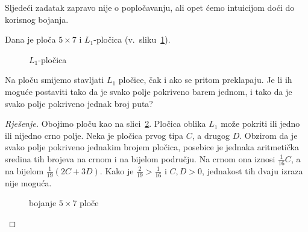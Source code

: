 \documentclass[11pt]{scrartcl}
\begin{document}
Sljedeći zadatak zapravo nije o popločavanju, ali opet ćemo intuicijom doći do korisnog bojanja.
\begin{zadatak}
Dana je ploča $5 \times 7$ i $L_1$-pločica (v.\ sliku~\ref{fig:L_1}).

\begin{figure}[h!]
\centering
{}
\caption{$L_1$-pločica}
\label{fig:L_1}
\end{figure}

\noindent Na ploču smijemo stavljati $L_1$ pločice, čak i ako se pritom preklapaju. Je li ih moguće postaviti tako da je svako polje pokriveno barem jednom, i tako da je svako polje pokriveno jednak broj puta?
\end{zadatak}
\begin{proof}[Rješenje]
Obojimo ploču kao na slici~\ref{fig:5times7}. Pločica oblika $L_1$ može pokriti ili jedno ili nijedno crno polje. Neka je pločica prvog tipa $C$, a drugog $D$. Obzirom da je svako polje pokriveno jednakim brojem pločica, posebice je jednaka aritmetička sredina tih brojeva na crnom i na bijelom području. Na crnom ona iznosi $\frac{1}{16} C$, a na bijelom $\frac{1}{19} \left(2C + 3D\right)$. Kako je $\frac{2}{19} > \frac{1}{16}$ i $C, D > 0$, jednakost tih dvaju izraza nije moguća.
\begin{figure}[h]
\centering
{}
\caption{bojanje $5 \times 7$ ploče}
\label{fig:5times7}
\end{figure}
\end{proof}
\end{document}
